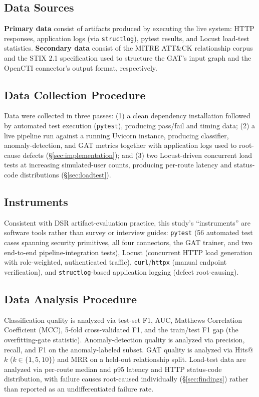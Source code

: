 \documentclass[conference]{IEEEtran}
\begin{document}
\subsection{Data Sources}
\textbf{Primary data} consist of artifacts produced by executing the live system: HTTP responses, application logs (via \texttt{structlog}), pytest results, and Locust load-test statistics. \textbf{Secondary data} consist of the MITRE ATT\&CK relationship corpus \cite{strom2018attack} and the STIX 2.1 specification \cite{stix21} used to structure the GAT's input graph and the OpenCTI connector's output format, respectively.

\subsection{Data Collection Procedure}
Data were collected in three passes: (1) a clean dependency installation followed by automated test execution (\texttt{pytest}), producing pass/fail and timing data; (2) a live pipeline run against a running Uvicorn instance, producing classifier, anomaly-detection, and GAT metrics together with application logs used to root-cause defects (\S\ref{sec:implementation}); and (3) two Locust-driven concurrent load tests at increasing simulated-user counts, producing per-route latency and status-code distributions (\S\ref{sec:loadtest}).

\subsection{Instruments}
\label{sec:instruments}
Consistent with DSR artifact-evaluation practice, this study's ``instruments'' are software tools rather than survey or interview guides: \texttt{pytest} (56 automated test cases spanning security primitives, all four connectors, the GAT trainer, and two end-to-end pipeline-integration tests), Locust (concurrent HTTP load generation with role-weighted, authenticated traffic), \texttt{curl}/\texttt{httpx} (manual endpoint verification), and \texttt{structlog}-based application logging (defect root-causing).

\subsection{Data Analysis Procedure}
Classification quality is analyzed via test-set F1, AUC, Matthews Correlation Coefficient (MCC), 5-fold cross-validated F1, and the train/test F1 gap (the overfitting-gate statistic). Anomaly-detection quality is analyzed via precision, recall, and F1 on the anomaly-labeled subset. GAT quality is analyzed via Hits@$k$ ($k \in \{1,5,10\}$) and MRR on a held-out relationship split. Load-test data are analyzed via per-route median and p95 latency and HTTP status-code distribution, with failure causes root-caused individually (\S\ref{sec:findings}) rather than reported as an undifferentiated failure rate.
\end{document}
